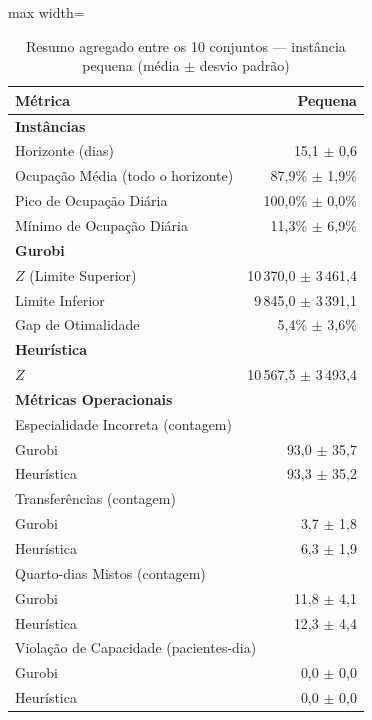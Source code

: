 \begin{table}[htbp]
    \caption{Resumo agregado entre os 10 conjuntos --- instância pequena (média $\pm$ desvio padrão)}
    \label{tab:agregado-pequeno}
    \centering
    \begin{adjustbox}{max width=\textwidth}
    \begin{tabular}{lr}
        \hline
        \textbf{Métrica} & \textbf{Pequena} \\
        \hline
        \multicolumn{2}{l}{\textbf{Instâncias}} \\
        Horizonte (dias) & 15,1 $\pm$ 0,6 \\
        Ocupação Média (todo o horizonte) & 87,9\% $\pm$ 1,9\% \\
        Pico de Ocupação Diária & 100,0\% $\pm$ 0,0\% \\
        Mínimo de Ocupação Diária & 11,3\% $\pm$ 6,9\% \\
        \hline
        \multicolumn{2}{l}{\textbf{Gurobi}} \\
        $Z$ (Limite Superior) & 10\,370,0 $\pm$ 3\,461,4 \\
        Limite Inferior & 9\,845,0 $\pm$ 3\,391,1 \\
        Gap de Otimalidade & 5,4\% $\pm$ 3,6\% \\
        \hline
        \multicolumn{2}{l}{\textbf{Heurística}} \\
        $Z$ & 10\,567,5 $\pm$ 3\,493,4 \\
        \hline
        \multicolumn{2}{l}{\textbf{Métricas Operacionais}} \\
        \multicolumn{2}{l}{Especialidade Incorreta (contagem)} \\
        \quad Gurobi & 93,0 $\pm$ 35,7 \\
        \quad Heurística & 93,3 $\pm$ 35,2 \\
        \multicolumn{2}{l}{Transferências (contagem)} \\
        \quad Gurobi & 3,7 $\pm$ 1,8 \\
        \quad Heurística & 6,3 $\pm$ 1,9 \\
        \multicolumn{2}{l}{Quarto-dias Mistos (contagem)} \\
        \quad Gurobi & 11,8 $\pm$ 4,1 \\
        \quad Heurística & 12,3 $\pm$ 4,4 \\
        \multicolumn{2}{l}{Violação de Capacidade (pacientes-dia)} \\
        \quad Gurobi & 0,0 $\pm$ 0,0 \\
        \quad Heurística & 0,0 $\pm$ 0,0 \\
        \hline
    \end{tabular}
    \end{adjustbox}
\end{table}
